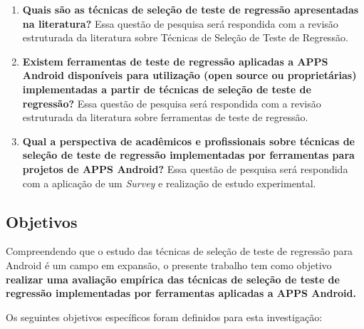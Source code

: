 \begin{enumerate}[label=\bf QP\arabic*,leftmargin=1.8cm]
    
    \item \textbf{Quais são as técnicas de seleção de teste de regressão apresentadas na literatura?} Essa questão de pesquisa será respondida com a revisão estruturada da literatura sobre Técnicas de Seleção de Teste de Regressão.
    
    \item \textbf{Existem ferramentas de teste de regressão aplicadas a \ac{APPS} Android disponíveis para utilização (open source ou proprietárias) implementadas a partir de técnicas de seleção de teste de regressão?} Essa questão de pesquisa será respondida com a revisão estruturada da literatura sobre ferramentas de teste de regressão.
    
    \item \textbf{Qual a perspectiva de acadêmicos e profissionais sobre técnicas de seleção de teste de regressão implementadas por ferramentas para projetos de \ac{APPS} Android?} Essa questão de pesquisa será respondida com a aplicação de um \textit{Survey} e realização de estudo experimental.

\end{enumerate}



\subsection{Objetivos}

Compreendendo que o estudo das técnicas de seleção de teste de regressão para Android é um campo em expansão, o presente trabalho tem como objetivo \textbf{realizar uma avaliação empírica das técnicas de seleção de teste de regressão implementadas por ferramentas aplicadas a \ac{APPS} Android.}

Os seguintes objetivos específicos foram definidos para esta investigação:

